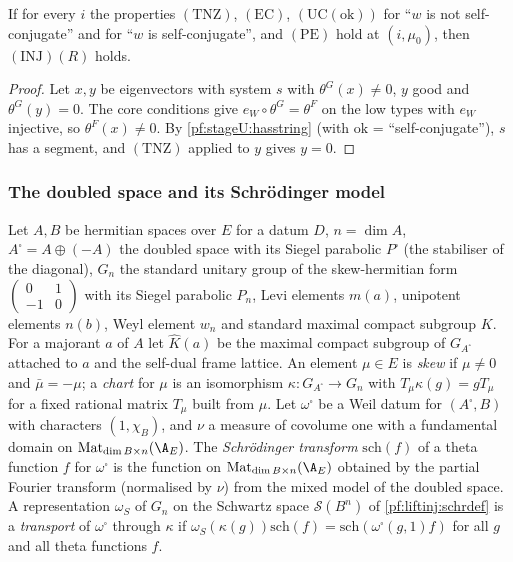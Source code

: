 \begin{lemma}\label{pf:stageU:liftinj}
If for every $i$ the properties $(\mathrm{TNZ})$, $(\mathrm{EC})$, $(\mathrm{UC}(\mathrm{ok}))$ for ``$w$ is not self-conjugate'' and for ``$w$ is
self-conjugate'', and $(\mathrm{PE})$ hold at $(i,\mu_0)$, then $(\mathrm{INJ})(R)$ holds.
\end{lemma}

\begin{proof}
Let $x,y$ be eigenvectors with system $s$ with $\theta^G(x)\ne0$, $y$ good and $\theta^G(y)=0$. The core conditions give
$e_W\circ\theta^G=\theta^F$ on the low types with $e_W$ injective, so $\theta^F(x)\ne0$. By \cref{pf:stageU:hasstring} (with
$\mathrm{ok}$ = ``self-conjugate''), $s$ has a segment, and $(\mathrm{TNZ})$ applied to $y$ gives $y=0$.
\end{proof}

\subsubsection{The doubled space and its Schr\"odinger model}\label{sec:pf:stageU:dbl}

Let $A,B$ be hermitian spaces over $E$ for a datum $D$, $n=\dim A$, $A^\square=A\oplus(-A)$ the doubled space with its Siegel
parabolic $P^\square$ (the stabiliser of the diagonal), $G_n$ the standard unitary group of the skew-hermitian form
$\left(\begin{smallmatrix}0&1\\-1&0\end{smallmatrix}\right)$ with its Siegel parabolic $P_n$, Levi elements $m(a)$, unipotent elements
$n(b)$, Weyl element $w_n$ and standard maximal compact subgroup $K$. For a majorant $a$ of $A$ let $\hat K(a)$ be the maximal
compact subgroup of $G_{A^\square}$ attached to $a$ and the self-dual frame lattice. An element $\mu\in E$ is \emph{skew} if
$\mu\ne0$ and $\bar\mu=-\mu$; a \emph{chart} for $\mu$ is an isomorphism $\kappa:G_{A^\square}\to G_n$ with $T_\mu\kappa(g)=gT_\mu$
for a fixed rational matrix $T_\mu$ built from $\mu$. Let $\omega^\square$ be a Weil datum for $(A^\square,B)$ with characters
$(1,\chi_B)$, and $\nu$ a measure of covolume one with a fundamental domain on $\mathrm{Mat}_{\dim B\times n}(\A_E)$. The
\emph{Schr\"odinger transform} $\mathrm{sch}(f)$ of a theta function $f$ for $\omega^\square$ is the function on
$\mathrm{Mat}_{\dim B\times n}(\A_E)$ obtained by the partial Fourier transform (normalised by $\nu$) from the mixed model of the doubled
space. A representation $\omega_S$ of $G_n$ on the Schwartz space $\mathcal S(B^n)$ of \cref{pf:liftinj:schrdef} is a
\emph{transport} of $\omega^\square$ through $\kappa$ if $\omega_S(\kappa(g))\mathrm{sch}(f)=\mathrm{sch}(\omega^\square(g,1)f)$ for all $g$
and all theta functions $f$.

